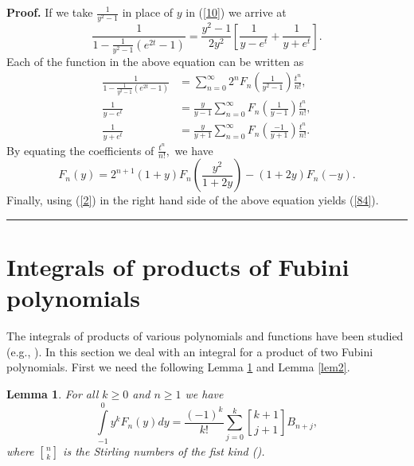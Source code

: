 \documentclass{article}%
\newtheorem{lemma}[theorem]{Lemma}
\newenvironment{proof}[1][Proof]{\noindent\textbf{#1.} }{\ \rule{0.5em}{0.5em}}
\begin{document}
\begin{proof}
If we take $\frac{1}{y^{2}-1}$ in place of $y$ in (\ref{10}) we arrive at%
\begin{equation}
\frac{1}{1-\frac{1}{y^{2}-1}\left(  e^{2t}-1\right)  }=\frac{y^{2}-1}{2y^{2}%
}\left[  \frac{1}{y-e^{t}}+\frac{1}{y+e^{t}}\right]  . \label{79}%
\end{equation}
Each of the function in the above equation can be written as
\begin{align}
\frac{1}{1-\frac{1}{y^{2}-1}\left(  e^{2t}-1\right)  }  &  =\sum_{n=0}%
^{\infty}2^{n}F_{n}\left(  \frac{1}{y^{2}-1}\right)  \frac{t^{n}}%
{n!},\label{80}\\
\frac{1}{y-e^{t}}  &  =\frac{y}{y-1}\sum_{n=0}^{\infty}F_{n}\left(  \frac
{1}{y-1}\right)  \frac{t^{n}}{n!},\label{81}\\
\frac{1}{y+e^{t}}  &  =\frac{y}{y+1}\sum_{n=0}^{\infty}F_{n}\left(  \frac
{-1}{y+1}\right)  \frac{t^{n}}{n!}. \label{82}%
\end{align}
By equating the coefficients of $\frac{t^{n}}{n!},$ we have%
\begin{equation}
F_{n}\left(  y\right)  =2^{n+1}\left(  1+y\right)  F_{n}\left(  \frac{y^{2}%
}{1+2y}\right)  -\left(  1+2y\right)  F_{n}\left(  -y\right)  . \label{24}%
\end{equation}
Finally, using (\ref{2}) in the right hand side of the above equation yields
(\ref{84}).
\end{proof}

\section{Integrals of products of Fubini polynomials}

The integrals of products of various polynomials and functions have been
studied (e.g., \cite{Agoh2, B2, Dagli1, Kim, Liu}). In this section we deal
with an integral for a product of two Fubini polynomials. First we need the
following Lemma \ref{lem1} and Lemma \ref{lem2}.

\begin{lemma}
\label{lem1}For all $k\geq0$ and $n\geq1$ we have%
\begin{equation}%
{\displaystyle\int\limits_{-1}^{0}}
y^{k}F_{n}\left(  y\right)  dy=\frac{\left(  -1\right)  ^{k}}{k!}\sum
_{j=0}^{k}%
\genfrac{[}{]}{0pt}{}{k+1}{j+1}%
B_{n+j}, \label{25}%
\end{equation}
where $%
\genfrac{[}{]}{0pt}{}{n}{k}%
$ is the Stirling numbers of the fist kind (\cite{Graham}).
\end{lemma}
\end{document}
